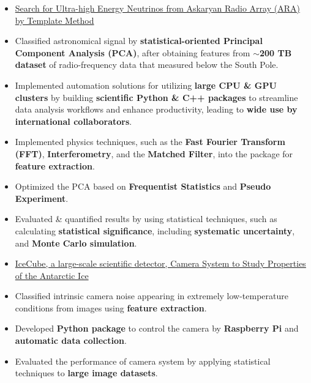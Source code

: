 \documentclass[10pt,a4paper,ragged2e,withhyper]{altacv}
\begin{document}
\begin{paracol}{2}

\begin{itemize}
\item \href{https://user-web.icecube.wisc.edu/~mkim/ARA_MF/index.html}{Search for Ultra-high Energy Neutrinos from Askaryan Radio Array (ARA) by Template Method \faLink}
\item Classified astronomical signal by {\bf statistical-oriented Principal Component Analysis (PCA)}, after obtaining features from {\bf ${\sim}$200 TB dataset} of radio-frequency data that measured below the South Pole.
\item Implemented automation solutions for utilizing {\bf large CPU \& GPU clusters} by building {\bf scientific Python \& C++ packages} to streamline data analysis workflows and enhance productivity, leading to {\bf wide use by international collaborators}.
\item Implemented physics techniques, such as the {\bf Fast Fourier Transform (FFT)}, {\bf Interferometry}, and the {\bf Matched Filter}, into the package for {\bf feature extraction}.
\item Optimized the PCA based on {\bf Frequentist Statistics} and {\bf Pseudo Experiment}.
\item Evaluated \& quantified results by using statistical techniques, such as calculating {\bf statistical significance}, including {\bf systematic uncertainty}, and {\bf Monte Carlo simulation}.
\end{itemize}
\divider

\begin{itemize}
\item \href{https://pos.sissa.it/236/1145/pdf}{IceCube, a large-scale scientific detector, Camera System to Study Properties of the Antarctic Ice \faLink}
\item Classified intrinsic camera noise appearing in extremely low-temperature conditions from images using {\bf feature extraction}.
\item Developed {\bf Python package} to control the camera by {\bf Raspberry Pi} and {\bf automatic data collection}.
\item Evaluated the performance of camera system by applying statistical techniques to {\bf large image datasets}.
\end{itemize}
\divider


\end{paracol}
\end{document}
